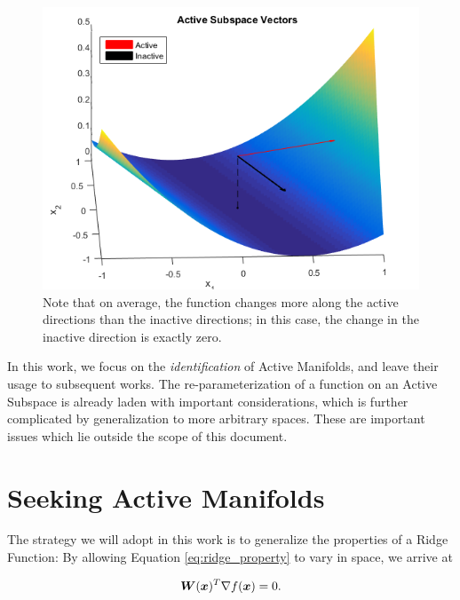 \documentclass[]{aiaa-tc}%
\begin{document}
\begin{figure}
 \includegraphics{../images/surface_plot}
 \caption{Note that on average, the function changes more along the active directions than the inactive directions; in this case, the change in the inactive direction is exactly zero.}
 \label{fig:as_example}
\end{figure}

In this work, we focus on the \emph{identification} of Active Manifolds, and leave their usage to subsequent works. The re-parameterization of a function on an Active Subspace is already laden with important considerations, which is further complicated by generalization to more arbitrary spaces. These are important issues which lie outside the scope of this document.

\section{Seeking Active Manifolds} \label{sec:active_manifolds}
The strategy we will adopt in this work is to generalize the properties of a Ridge Function: By allowing Equation \ref{eq:ridge_property} to vary in space, we arrive at

\begin{equation}
  \label{eq:inactive_manifold}
  \boldsymbol{W}(\boldsymbol{x})^T \nabla f(\boldsymbol{x}) = 0.
\end{equation}%
%
%
%
%
\end{document}
